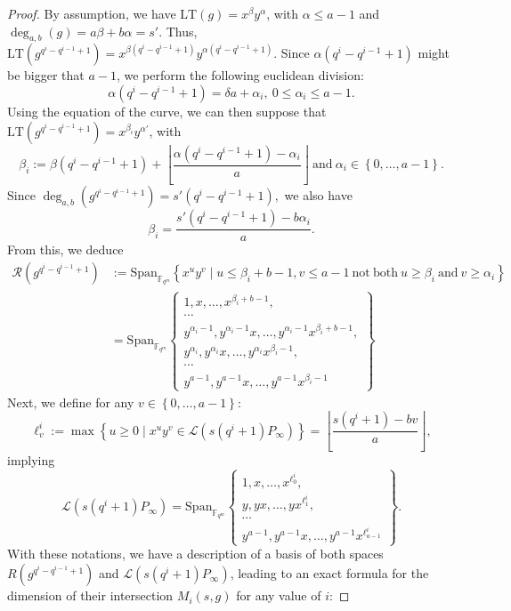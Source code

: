 \documentclass[a4paper]{article}
\theoremstyle{definition}
\theoremstyle{remark}
\newcommand{\calL}{\mathcal{L}}
\newcommand{\calR}{\mathcal{R}}
\newcommand{\fqm}{\mathbb{F}_{q^m}}
\newcommand{\set}[1]{\left\{#1\right\}}
\newcommand{\degab}[1]{\deg_{a,b}\left(#1\right)}
\begin{document}
\begin{proof}


By assumption, we have $\mathrm{LT}(g)=x^{\beta}y^{\alpha}$, with $\alpha \leq a-1$ and $\degab{g}=a\beta +b\alpha=s'$. 
Thus, $\mathrm{LT}(g^{q^i-q^{i-1}+1})=x^{\beta (q^i-q^{i-1}+1)}y^{\alpha (q^i-q^{i-1}+1)}$. Since $\alpha (q^i-q^{i-1}+1)$ might be bigger that $a-1$, we perform the following euclidean division:
$$\alpha (q^i-q^{i-1}+1) = \delta a + \alpha_i, \ 0 \leq \alpha_i \leq a-1.$$
Using the equation of the curve, we can then suppose that $\mathrm{LT}(g^{q^i-q^{i-1}+1})=x^{\beta_i}y^{\alpha '}$, with 
$$\beta_i := \beta (q^i-q^{i-1}+1) + \left\lfloor \frac{\alpha (q^i-q^{i-1}+1)-\alpha_i}{a} \right\rfloor \ \mathrm{and} \ \alpha_i \in \set{0,\dots,a-1}.$$
Since $\degab{g^{q^i-q^{i-1}+1}} = s'(q^i-q^{i-1}+1),$ we also have 
\begin{equation} \label{eq:value_beta_prime}
\beta_i = \dfrac{s'(q^i-q^{i-1}+1)-b\alpha_i}{a}.
\end{equation}
From this, we deduce
\begin{align*}
\calR\left(g^{q^i-q^{i-1}+1}\right) &:= \mathrm{Span}_{\fqm} \left\{x^uy^v \mid u \leq \beta_i+b-1 , v \leq a-1 \ \mathrm{not \ both} \ u \geq \beta_i \ \mathrm{and} \ v \geq \alpha_i\right\} \\
&= \mathrm{Span}_{\fqm}    \left\{ \begin{array}{c}
         1,x,\dots,x^{\beta_i +b-1},   \\
         \cdots \\
         y^{\alpha_i -1},y^{\alpha_i -1}x,\dots,y^{\alpha_i -1}x^{\beta_i +b-1}, \\
          y^{\alpha_i},y^{\alpha_i}x,\dots,y^{\alpha_i}x^{\beta_i-1}, \\
         \cdots \\
         y^{a-1},y^{a-1}x,\dots,y^{a-1}x^{\beta_i-1}
    \end{array}
    \right\}
\end{align*}
Next, we define for any $v \in \set{0,\dots,a-1}$:
$$\ell^i_v := \max \set{u \geq 0 \mid x^uy^v \in \calL(s(q^i+1)P_\infty)} = \left\lfloor \dfrac{s(q^i+1)-bv}{a}\right\rfloor,$$
implying
\begin{equation*}
\calL(s(q^i+1)P_\infty) = \mathrm{Span}_{\fqm}    \left\{ \begin{array}{c}
         1,x,\dots,x^{\ell^i_0},   \\
         y,yx,\dots,yx^{\ell^i_1}, \\
         \cdots \\
         y^{a-1},y^{a-1}x,\dots,y^{a-1}x^{\ell^i_{a-1}}
    \end{array}
    \right\}.
\end{equation*}
With these notations, we have a description of a basis of both spaces $R(g^{q^i-q^{i-1}+1})$ and $\calL(s(q^i+1)P_\infty)$, leading to an exact formula for the dimension of their intersection $M_i(s,g)$ for any value of $i$:


\end{proof}
\end{document}
